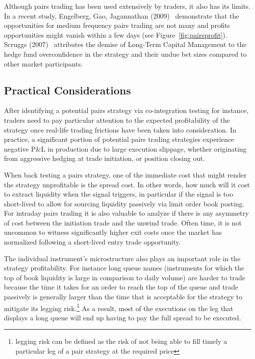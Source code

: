 Although pairs trading has been used extensively by traders, it also has its limits. In a recent study, Engelberg, Gao, Jagannathan (2009)~\cite{engelberg2009anatomy} demonstrate that the opportunities for medium frequency pairs trading are not many and profits opportunities might vanish within a few days (see Figure~\ref{fig:pairsprofit}). Scruggs (2007)~\cite{scruggs} attributes the demise of Long-Term Capital Management to the hedge fund overconfidence in the strategy and their undue bet sizes compared to other market participants.



\subsection{Practical Considerations \label{s:pract_consid}}


After identifying a potential pairs strategy via co-integration testing for instance, traders need to pay particular attention to the expected profitability of the strategy once real-life trading frictions have been taken into consideration. In practice, a significant portion of potential pairs trading strategies experience negative P\&L in production due to large execution slippage, whether originating from aggressive hedging at trade initiation, or position closing out.


When back testing a pairs strategy, one of the immediate cost that might render the strategy unprofitable is the spread cost. In other words, how much will it cost to extract liquidity when the signal triggers, in particular if the signal is too short-lived to allow for sourcing liquidity passively via limit order book posting. For intraday pairs trading it is also valuable to analyze if there is any asymmetry of cost between the initiation trade and the unwind trade. Often time, it is not uncommon to witness significantly higher exit costs once the market has normalized following a short-lived entry trade opportunity. 


The individual instrument's microstructure also plays an important role in the strategy profitability. For instance long queue names  (instruments for which the top of book liquidity is large in comparison to daily volume)  are harder to trade because the time it takes for an order to reach the top of the queue and trade passively is generally larger than the time that is acceptable for the strategy to mitigate its legging risk.\footnote{legging risk can be defined as the risk of not being able to fill timely a particular leg of a pair strategy at the required price} As a result, most of the executions on the leg that displays a long queue will end up having to pay the full spread to be executed. 


